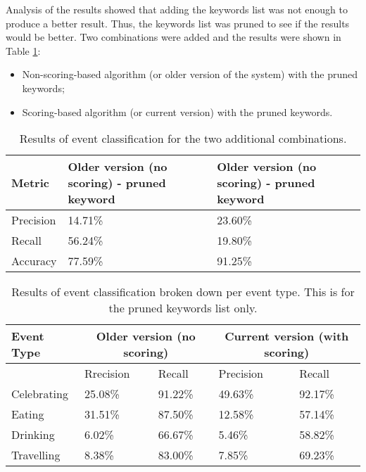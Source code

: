 Analysis of the results showed that adding the keywords list was not enough to produce a better result. Thus, the keywords list was pruned to see if the results would be better. Two combinations were added and the results were shown in Table \ref{tab:classification-pruned}: 
\begin{itemize}
	\item Non-scoring-based algorithm (or older version of the system) with the pruned keywords;
	\item Scoring-based algorithm (or current version) with the pruned keywords.
\end{itemize}

\begin{table}[ph!]
\centering
\caption{Results of event classification for the two additional combinations.}
\begin{tabular}{|p{1in}|p{2in}|p{2in}|} \hline
Metric    & Older version (no scoring) - pruned keyword & Older version (no scoring) - pruned keyword \\ \hline
Precision & 14.71\%                                    & 23.60\%                                     \\ \hline
Recall    & 56.24\%                                     & 19.80\%                                     \\ \hline
Accuracy  & 77.59\%                                     & 91.25\%                                    \\ \hline
\end{tabular}
\label{tab:classification-pruned}
\end{table}

\clearpage
\begin{table}[ph!]   %
	\centering
	\caption{Results of event classification broken down per event type. This is for the pruned keywords list only.} \vspace{0.25em}
	\begin{tabular}{|p{1in}|p{1in}|p{1in}|p{1in}|p{1in}|} \hline
		\centering Event Type & \multicolumn{2}{|c|}{Older version (no scoring)} &\multicolumn{2}{|c|}{Current version (with scoring)} \\ \cline{2-2}\hline
		& Rrecision & Recall & Precision &Recall\\\hline
		Celebrating & 25.08\% & 91.22\% & 49.63\% & 92.17\% \\ \hline
		Eating & 31.51\% & 87.50\% & 12.58\% & 57.14\% \\ \hline
		Drinking & 6.02\% & 66.67\%  & 5.46\% & 58.82\% \\ \hline
		Travelling & 8.38\% & 83.00\%  & 7.85\% & 69.23\% \\ \hline
	\end{tabular}
	\label{tab:eventclassification-pruned2}
\end{table}

